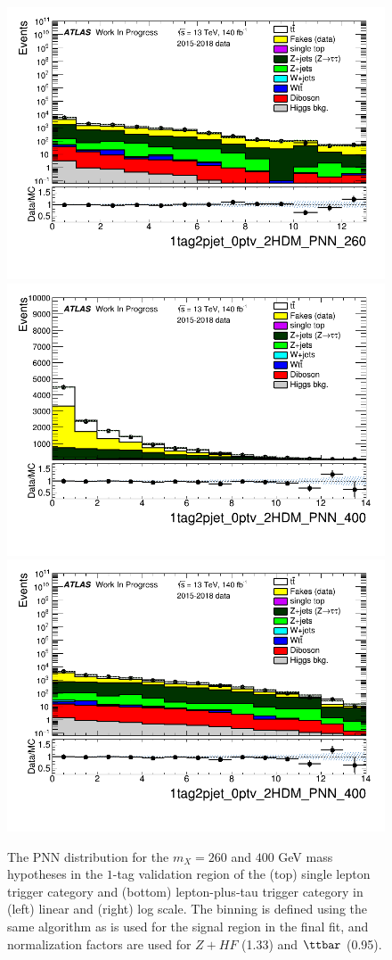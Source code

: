 \begin{figure}
\includegraphics[width=.45\textwidth]{figures/lephadFF/LTT/1tag2pjet_0ptv_2HDM_PNN_260_LTT_ALLFAKES_Bulb_noNeg_log.png}\\
\includegraphics[width=.45\textwidth]{figures/lephadFF/LTT/1tag2pjet_0ptv_2HDM_PNN_400_LTT_ALLFAKES_Bulb_noNeg_lin.png}
\includegraphics[width=.45\textwidth]{figures/lephadFF/LTT/1tag2pjet_0ptv_2HDM_PNN_400_LTT_ALLFAKES_Bulb_noNeg_log.png}\\
\caption{The PNN distribution for the $m_{X} = 260$ and $400$ GeV mass hypotheses in the $1$-tag validation region of the (top) single lepton trigger category and (bottom) lepton-plus-tau trigger category in (left) linear and (right) log scale. The binning is defined using the same algorithm as is used for the signal region in the final fit, and normalization factors are used for $Z+HF$ (1.33) and $\ttbar$ (0.95).}
\label{fig:SLT_LTT_1tag}
\end{figure}

